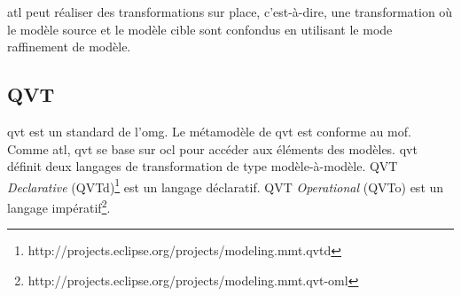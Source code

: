 \gls{atl} peut réaliser des transformations sur place, c'est-à-dire, une 
transformation où le modèle source et le modèle cible sont confondus en 
utilisant le mode raffinement de modèle. 


\subsection{QVT}
\gls{qvt} \cite{kurtev2008state} \cite{omg2011meta} est un standard de l'\gls{omg}. Le métamodèle de \gls{qvt} est conforme au \gls{mof}. Comme \gls{atl}, \gls{qvt} se base sur \gls{ocl} pour accéder aux éléments des modèles.
\gls{qvt} définit deux langages de transformation de type modèle-à-modèle. 
QVT \textit{Declarative} (QVTd)\footnote{http://projects.eclipse.org/projects/modeling.mmt.qvtd} est un langage déclaratif. QVT \textit{Operational} (QVTo) est un langage impératif\footnote{http://projects.eclipse.org/projects/modeling.mmt.qvt-oml}.


%
%

